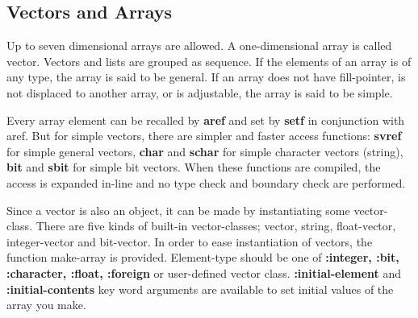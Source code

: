 \subsection{Vectors and Arrays}

Up to seven dimensional arrays are allowed.
A one-dimensional array is called vector.
Vectors and lists are grouped as sequence.
If the elements of an array is of any type, the array is said to be general.
If an array does not have fill-pointer, is not displaced to
another array, or is adjustable, the array is said to be simple.

Every array element can be recalled by {\bf aref} and set by {\bf setf} in
conjunction with aref.
But for simple vectors, there are simpler and faster access functions:
{\bf svref} for simple general vectors, {\bf char} and {\bf schar} for
simple character vectors (string), {\bf bit} and {\bf sbit} for
simple bit vectors.  When these functions are compiled,
the access is expanded in-line and no type check and boundary check are 
performed.

Since a vector is also an object,
it can be made by instantiating some vector-class.
There are five kinds of built-in vector-classes;
vector, string, float-vector, integer-vector and bit-vector.
In order to ease instantiation of vectors, the function make-array
is provided.
Element-type should be one of {\bf :integer, :bit, :character, :float, :foreign}
or user-defined vector class.
{\bf :initial-element} and {\bf :initial-contents} key word arguments are
available to set initial values of the array you make.

